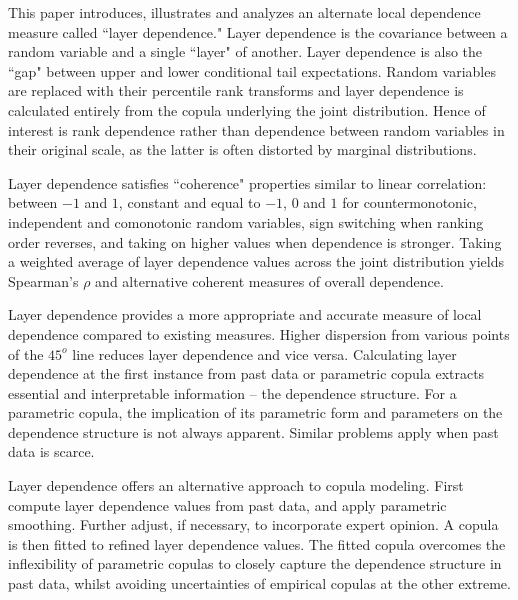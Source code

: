 \documentclass[authoryear]{elsarticle}
\begin{document}
This paper introduces, illustrates and analyzes an alternate local dependence measure called  ``layer dependence." Layer dependence is the covariance between a random variable and a single ``layer" of another. Layer dependence is also the ``gap" between upper and lower conditional tail expectations. Random variables are replaced with their percentile rank transforms and layer dependence is calculated entirely from the copula underlying the joint distribution. Hence of interest is rank dependence rather than dependence between random variables in their original scale, as the latter is often distorted by marginal distributions.


Layer dependence satisfies ``coherence" properties similar to linear correlation: between $-1$ and $1$, constant and equal to $-1$, $0$ and $1$ for countermonotonic, independent and comonotonic random variables, sign switching when ranking order reverses, and taking on higher values when dependence is stronger. Taking a weighted average of layer dependence values across the joint distribution yields Spearman's $\rho$ and alternative coherent measures of overall dependence.


Layer dependence provides a more appropriate and accurate measure of local dependence compared to existing measures. Higher dispersion from various points of the $45^o$ line reduces layer dependence and vice versa. Calculating layer dependence at the first instance from past data or parametric copula extracts essential and interpretable information -- the dependence structure. For a parametric copula, the implication of its parametric form and parameters on the dependence structure is not always apparent. Similar problems apply when past data is scarce.


Layer dependence offers an alternative approach to copula modeling. First compute layer dependence values from past data, and apply parametric smoothing. Further adjust, if necessary, to incorporate expert opinion. A copula is then fitted to refined layer dependence values. The fitted copula overcomes the inflexibility of parametric copulas to closely capture the dependence structure in past data, whilst avoiding uncertainties of empirical copulas at the other extreme.
\end{document}
